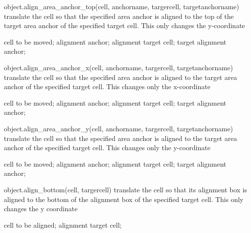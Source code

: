 \begin{APIfunc}{object.align\_area\_anchor\_top(cell, anchorname, targercell, targetanchorname)}
    translate the cell so that the specified area anchor is aligned to the top of the target area anchor of the specified target cell. This only changes the y-coordinate
    \begin{APIparameters}
            cell to be moved;
            alignment anchor;
            alignment target cell;
            target alignment anchor;
    \end{APIparameters}
\end{APIfunc}
\begin{APIfunc}{object.align\_area\_anchor\_x(cell, anchorname, targercell, targetanchorname)}
    translate the cell so that the specified area anchor is aligned to the target area anchor of the specified target cell. This changes only the x-coordinate
    \begin{APIparameters}
            cell to be moved;
            alignment anchor;
            alignment target cell;
            target alignment anchor;
    \end{APIparameters}
\end{APIfunc}
\begin{APIfunc}{object.align\_area\_anchor\_y(cell, anchorname, targercell, targetanchorname)}
    translate the cell so that the specified area anchor is aligned to the target area anchor of the specified target cell. This changes only the y-coordinate
    \begin{APIparameters}
            cell to be moved;
            alignment anchor;
            alignment target cell;
            target alignment anchor;
    \end{APIparameters}
\end{APIfunc}
\begin{APIfunc}{object.align\_bottom(cell, targercell)}
    translate the cell so that its alignment box is aligned to the bottom of the alignment box of the specified target cell. This only changes the y coordinate
    \begin{APIparameters}
            cell to be aligned;
            alignment target cell;
    \end{APIparameters}
\end{APIfunc}
